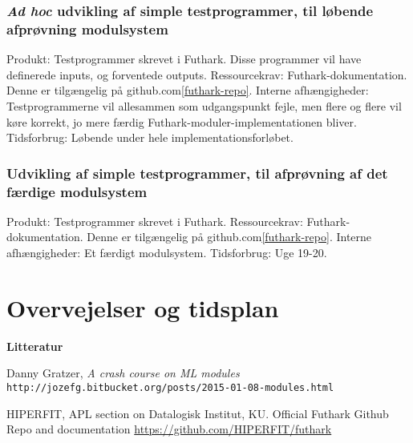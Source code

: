 \documentclass[12pt]{article}
\begin{document}
\subsubsection{\textit{Ad hoc} udvikling af simple testprogrammer, til løbende afprøvning 
modulsystem}
Produkt: Testprogrammer skrevet i Futhark. Disse programmer vil have definerede
inputs, og forventede outputs.
Ressourcekrav: Futhark-dokumentation. Denne er tilgængelig på github.com\ref{futhark-repo}.
Interne afhængigheder: Testprogrammerne vil allesammen som udgangspunkt fejle,
men flere og flere vil køre korrekt, jo mere færdig Futhark-moduler-implementationen bliver.
Tidsforbrug: Løbende under hele implementationsforløbet.

\subsubsection{Udvikling af simple testprogrammer, til afprøvning 
af det færdige modulsystem}
Produkt: Testprogrammer skrevet i Futhark.
Ressourcekrav: Futhark-dokumentation. Denne er tilgængelig på github.com\ref{futhark-repo}.
Interne afhængigheder: Et færdigt modulsystem.
Tidsforbrug: Uge 19-20.

\section{Overvejelser og tidsplan}
\textbf{Litteratur}
\begin{thebibliography}
Danny Gratzer, \textit{A crash course on ML modules}
\texttt{http://jozefg.bitbucket.org/posts/2015-01-08-modules.html}

HIPERFIT, APL section on Datalogisk Institut, KU.
Official Futhark Github Repo and documentation
\url{https://github.com/HIPERFIT/futhark}
\end{thebibliography}
\end{document}
